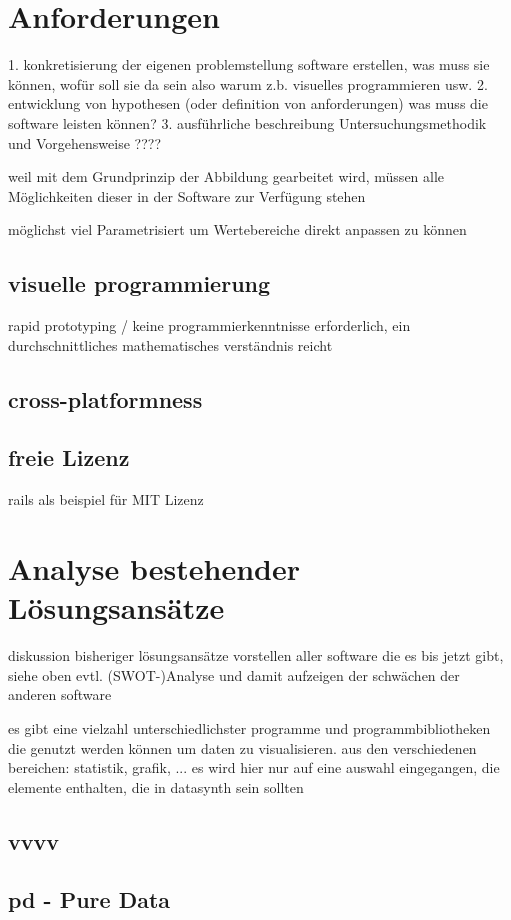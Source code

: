 \documentclass[a4paper, 12pt, onepage, pdftex, headsepline, footsepline]{scrreprt}
\begin{document}
\section{Anforderungen}
1. konkretisierung der eigenen problemstellung
software erstellen, was muss sie können, wofür soll sie da sein
also warum z.b. visuelles programmieren usw.
2. entwicklung von hypothesen (oder definition von anforderungen)
was muss die software leisten können?
3. ausführliche beschreibung Untersuchungsmethodik und Vorgehensweise
????

weil mit dem Grundprinzip der Abbildung gearbeitet wird, müssen alle Möglichkeiten dieser in der Software zur Verfügung stehen

möglichst viel Parametrisiert um Wertebereiche direkt anpassen zu können
\subsection{visuelle programmierung}
rapid prototyping / keine programmierkenntnisse erforderlich, ein durchschnittliches mathematisches verständnis reicht
\subsection{cross-platformness}
\subsection{freie Lizenz}
rails als beispiel für MIT Lizenz

\section{Analyse bestehender Lösungsansätze}
diskussion bisheriger lösungsansätze
vorstellen aller software die es bis jetzt gibt, siehe oben
evtl. (SWOT-)Analyse und damit aufzeigen der schwächen der anderen software

es gibt eine vielzahl unterschiedlichster programme und programmbibliotheken die genutzt werden können um daten zu visualisieren.
aus den verschiedenen bereichen: statistik, grafik, ...
es wird hier nur auf eine auswahl eingegangen, die elemente enthalten, die in datasynth sein sollten
\subsection{vvvv}
\subsection{pd - Pure Data}
\end{document}
